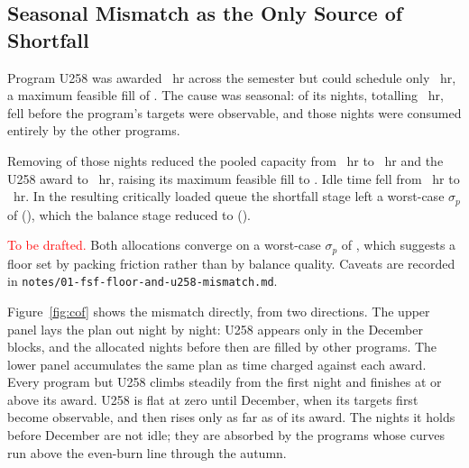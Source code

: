 \documentclass[twocolumn,linenumbers]{aastex63}
\newcommand{\red}[1]{\textcolor{red}{#1}}
\newcommand{\fsf}{\ensuremath{\sigma_p}\xspace}
\begin{document}
\subsection{Seasonal Mismatch as the Only Source of Shortfall}
\label{sec:balance:mismatch}

Program U258 was awarded ~hr across the semester but
could schedule only ~hr, a maximum feasible fill of
. The cause was seasonal: 
of its nights, totalling ~hr, fell before the
program's targets were observable, and those nights were consumed entirely by
the other programs.

Removing  of those nights reduced the pooled
capacity from ~hr to ~hr and the
U258 award to ~hr, raising its maximum feasible fill
to . Idle time fell from ~hr to
~hr. In the resulting critically loaded queue the shortfall
stage left a worst-case \fsf of 
(), which the balance stage reduced to
 ().

\red{To be drafted.} Both allocations converge on a worst-case \fsf of
, which suggests a floor set by packing friction
rather than by balance quality. Caveats are recorded in
\texttt{notes/01-fsf-floor-and-u258-mismatch.md}.

Figure~\ref{fig:cof} shows the mismatch directly, from two directions. The
upper panel lays the plan out night by night: U258 appears only in the December
blocks, and the allocated nights before then are filled by other programs. The
lower panel accumulates the same plan as time charged against each award. Every
program but U258 climbs steadily from the first night and finishes at or above
its award. U258 is flat at zero until December, when its targets first become
observable, and then rises only as far as  of its award.
The nights it holds before December are not idle; they are absorbed by the
programs whose curves run above the even-burn line through the autumn.
\end{document}
